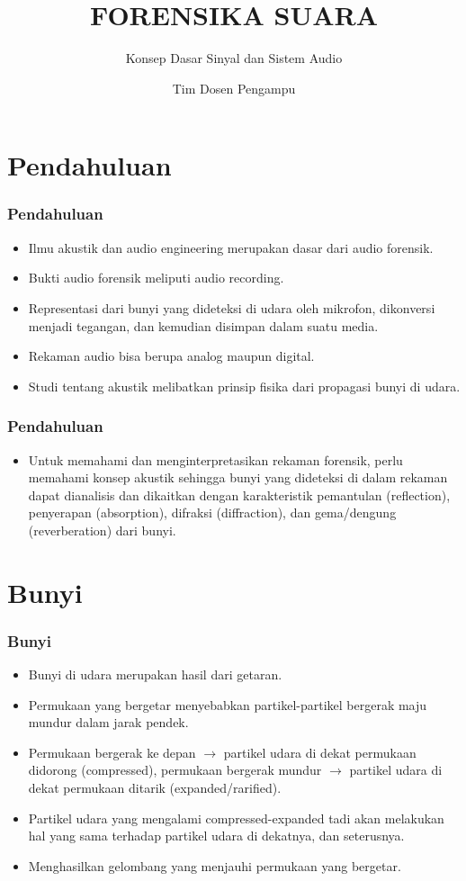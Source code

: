 \documentclass[pdflatex,compress]{beamer}
\title{FORENSIKA SUARA}
\subtitle{Konsep Dasar Sinyal dan Sistem Audio}
\author{Tim Dosen Pengampu}
\begin{document}
\maketitle

\section{Pendahuluan}

\begin{frame}
	\frametitle{Pendahuluan}
	\begin{itemize}
		\item Ilmu akustik dan audio engineering merupakan dasar dari audio forensik.
		\item Bukti audio forensik meliputi audio recording. \item Representasi dari bunyi yang dideteksi di udara oleh mikrofon, dikonversi menjadi tegangan, dan kemudian disimpan dalam suatu media.
		\item Rekaman audio bisa berupa analog maupun digital.
		\item Studi tentang akustik melibatkan prinsip fisika dari propagasi bunyi di udara.
	\end{itemize}
\end{frame}

\begin{frame}
	\frametitle{Pendahuluan}
	\begin{itemize}
		\item Untuk memahami dan menginterpretasikan rekaman forensik, perlu memahami konsep akustik sehingga bunyi yang dideteksi di dalam rekaman dapat dianalisis dan dikaitkan dengan karakteristik pemantulan (reflection), penyerapan (absorption), difraksi (diffraction), dan gema/dengung (reverberation) dari bunyi.
	\end{itemize}
\end{frame}

\section{Bunyi}

\begin{frame}
	\frametitle{Bunyi}
	\begin{itemize}
		\item Bunyi di udara merupakan hasil dari getaran.
		\item Permukaan yang bergetar menyebabkan partikel-partikel bergerak maju mundur dalam jarak pendek.
		\item Permukaan bergerak ke depan $\rightarrow$ partikel udara di dekat permukaan didorong (compressed), permukaan bergerak mundur $\rightarrow$ partikel udara di dekat permukaan ditarik (expanded/rarified).
		\item Partikel udara yang mengalami compressed-expanded tadi akan melakukan hal yang sama terhadap partikel udara di dekatnya, dan seterusnya.
		\item Menghasilkan gelombang yang menjauhi permukaan yang bergetar.
	\end{itemize}
\end{frame}
\end{document}
